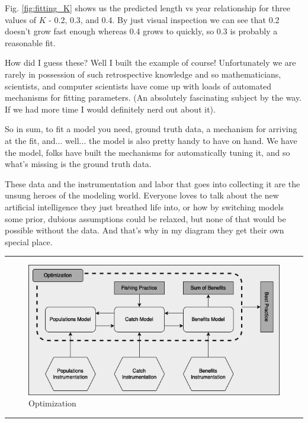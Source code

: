 \documentclass[11pt,a5paper]{book}
\begin{document}
Fig. \ref{fig:fitting_K} shows us the predicted length vs year relationship for three values of $K$ - 0.2, 0.3, and 0.4. By just visual inspection we can see that 0.2 doesn't grow fast enough whereas 0.4 grows to quickly, so 0.3 is probably a reasonable fit.
\newline

How did I guess these? Well I built the example of course! Unfortunately we are rarely in possession of such retrospective knowledge and so mathematicians, scientists, and computer scientists have come up with loads of automated mechanisms for fitting parameters. (An absolutely fascinating subject by the way. If we had more time I would definitely nerd out about it). 
\newline

So in sum, to fit a model you need, ground truth data, a mechanism for arriving at the fit, and... well... the model is also pretty handy to have on hand. We have the model, folks have built the mechanisms for automatically tuning it, and so what's missing is the ground truth data. 
\newline

These data and the instrumentation and labor that goes into collecting it are the unsung heroes of the modeling world. Everyone loves to talk about the new artificial intelligence they just breathed life into, or how by switching models some prior, dubious assumptions could be relaxed, but none of that would be possible without the data. And that's why in my diagram they get their own special place.
\newpage

\noindent \rule{\textwidth}{0.5pt} 
\begin{figure}[h!] 
  \includegraphics[width=\linewidth]{drawings/high_level_optimization.png}
  \caption{Optimization}
  \label{fig:high_level_optimization}
\end{figure}
\newline
\rule{\textwidth}{0.5pt} 
\vspace{5pt}
\end{document}
